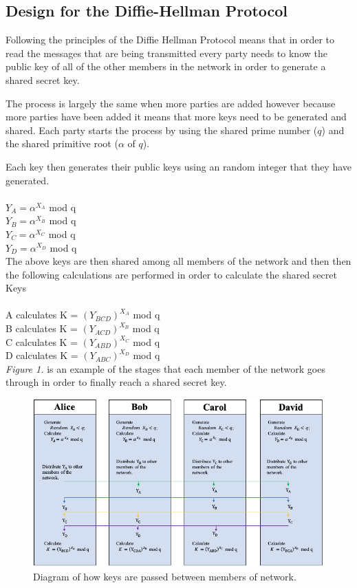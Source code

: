 \documentclass[a4paper, twoside, 11pt]{article}
\begin{document}
\subsection{Design for the Diffie-Hellman Protocol}
Following the principles of the Diffie Hellman Protocol means that in order
to read the messages that are being transmitted every party needs to know the
public key of all of the other members in the network in order to generate a shared secret key.

The process is largely the same when more parties are added however because more parties have been added it means that more keys need to be generated and shared. Each party starts the process by using the shared prime number ($q$) and the shared primitive root ($\alpha$ of $q$).

Each key then generates their public keys using an random integer that they have generated. \\
\\
$Y_A = \alpha^{X_A}$ mod q \\
$Y_B = \alpha^{X_B}$ mod q \\
$Y_C = \alpha^{X_C}$ mod q \\
$Y_D = \alpha^{X_D}$ mod q \\

The above keys are then shared among all members of the network and then
then the following calculations are performed in order to calculate the shared secret Keys\\
\\
A calculates K = $(Y_{BCD})^{X_A}$ mod q \\
B calculates K = $(Y_{ACD})^{X_B}$ mod q \\
C calculates K = $(Y_{ABD})^{X_C}$ mod q \\
D calculates K = $(Y_{ABC})^{X_D}$ mod q \\


\textit{Figure 1.} is an example of the stages that each member of the network goes through in order to finally reach a shared secret key. 

\begin{figure}[H]
	\centering
	\includegraphics[scale=0.6]{Images/exchangeDiagram.png}
  \caption{Diagram of how keys are passed between members of network.}
\end{figure}
\end{document}
